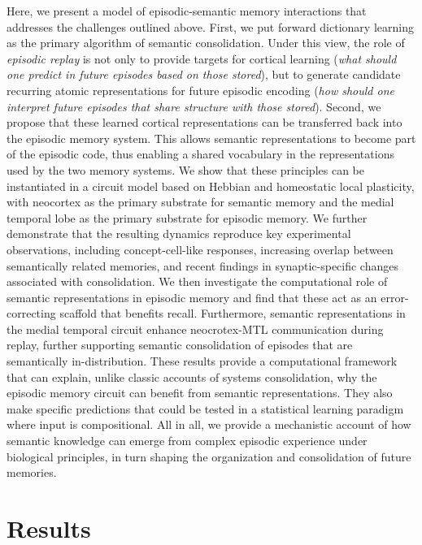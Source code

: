 \documentclass{article}
\begin{document}
Here, we present a model of episodic-semantic memory interactions that addresses the challenges outlined above. First, we put forward dictionary learning as the primary algorithm of semantic consolidation. Under this view, the role of \textit{episodic replay} is not only to provide targets for cortical learning (\textit{what should one predict in future episodes based on those stored}), but to generate candidate recurring atomic representations for future episodic encoding (\textit{how should one interpret future episodes that share structure with those stored}). Second, we propose that these learned cortical representations can be transferred back into the episodic memory system. This allows semantic representations to become part of the episodic code, thus enabling a shared vocabulary in the representations used by the two memory systems. We show that these principles can be instantiated in a circuit model based on Hebbian and homeostatic local plasticity, with neocortex as the primary substrate for semantic memory and the medial temporal lobe as the primary substrate for episodic memory. We further demonstrate that the resulting dynamics reproduce key experimental observations, including concept-cell-like responses, increasing overlap between semantically related memories, and recent findings in synaptic-specific changes associated with consolidation. We then investigate the computational role of semantic representations in episodic memory and find that these act as an error-correcting scaffold that benefits recall. Furthermore, semantic representations in the medial temporal circuit enhance neocrotex-MTL communication during replay, further supporting semantic consolidation of episodes that are semantically in-distribution. These results provide a computational framework that can explain, unlike classic accounts of systems consolidation, why the episodic memory circuit can benefit from semantic representations. They also make specific predictions that could be tested in a statistical learning paradigm where input is compositional. All in all, we provide a mechanistic account of how semantic knowledge can emerge from complex episodic experience under biological principles, in turn shaping the organization and consolidation of future memories.
\newpage
\section*{Results}
\end{document}
